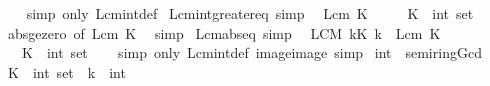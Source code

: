 \begin{isabellebody}
%
\isadelimproof
\ \ %
\endisadelimproof
%
\isatagproof
{}\isamarkupfalse%
\ {\isacharparenleft}{\kern0pt}simp\ only{\isacharcolon}{\kern0pt}\ Lcm{\isacharunderscore}{\kern0pt}int{\isacharunderscore}{\kern0pt}def{\isacharparenright}{\kern0pt}%
\endisatagproof
{\isafoldproof}%
%
\isadelimproof
\isanewline
%
\endisadelimproof
\isanewline
{}\isamarkupfalse%
\ Lcm{\isacharunderscore}{\kern0pt}int{\isacharunderscore}{\kern0pt}greater{\isacharunderscore}{\kern0pt}eq{\isacharunderscore}{\kern0pt}{}\ {\isacharbrackleft}{\kern0pt}simp{\isacharbrackright}{\kern0pt}{\isacharcolon}{\kern0pt}\isanewline
\ \ {\isachardoublequoteopen}Lcm\ K\ {\isasymge}\ {}{\isachardoublequoteclose}\isanewline
\ \ \ K\ {\isacharcolon}{\kern0pt}{\isacharcolon}{\kern0pt}\ {\isachardoublequoteopen}int\ set{\isachardoublequoteclose}\isanewline
%
\isadelimproof
\ \ %
\endisadelimproof
%
\isatagproof
{}\isamarkupfalse%
\ abs{\isacharunderscore}{\kern0pt}ge{\isacharunderscore}{\kern0pt}zero\ {\isacharbrackleft}{\kern0pt}of\ {\isachardoublequoteopen}Lcm\ K{\isachardoublequoteclose}{\isacharbrackright}{\kern0pt}\ \isamarkupfalse%
\ simp%
\endisatagproof
{\isafoldproof}%
%
\isadelimproof
\isanewline
%
\endisadelimproof
\isanewline
{}\isamarkupfalse%
\ Lcm{\isacharunderscore}{\kern0pt}abs{\isacharunderscore}{\kern0pt}eq\ {\isacharbrackleft}{\kern0pt}simp{\isacharbrackright}{\kern0pt}{\isacharcolon}{\kern0pt}\isanewline
\ \ {\isachardoublequoteopen}{\isacharparenleft}{\kern0pt}LCM\ k{\isasymin}K{\isachardot}{\kern0pt}\ {\isasymbar}k{\isasymbar}{\isacharparenright}{\kern0pt}\ {\isacharequal}{\kern0pt}\ Lcm\ K{\isachardoublequoteclose}\isanewline
\ \ \ K\ {\isacharcolon}{\kern0pt}{\isacharcolon}{\kern0pt}\ {\isachardoublequoteopen}int\ set{\isachardoublequoteclose}\isanewline
%
\isadelimproof
\ \ %
\endisadelimproof
%
\isatagproof
{}\isamarkupfalse%
\ {\isacharparenleft}{\kern0pt}simp\ only{\isacharcolon}{\kern0pt}\ Lcm{\isacharunderscore}{\kern0pt}int{\isacharunderscore}{\kern0pt}def\ image{\isacharunderscore}{\kern0pt}image{\isacharparenright}{\kern0pt}\ simp%
\endisatagproof
{\isafoldproof}%
%
\isadelimproof
\isanewline
%
\endisadelimproof
\isanewline
{}\isamarkupfalse%
\ int\ {\isacharcolon}{\kern0pt}{\isacharcolon}{\kern0pt}\ semiring{\isacharunderscore}{\kern0pt}Gcd\isanewline
%
\isadelimproof
%
\endisadelimproof
%
\isatagproof
{}\isamarkupfalse%
\isanewline
\ \ \isamarkupfalse%
\ K\ {\isacharcolon}{\kern0pt}{\isacharcolon}{\kern0pt}\ {\isachardoublequoteopen}int\ set{\isachardoublequoteclose}\ \ k\ {\isacharcolon}{\kern0pt}{\isacharcolon}{\kern0pt}\ int\isanewline

\end{isabellebody}

